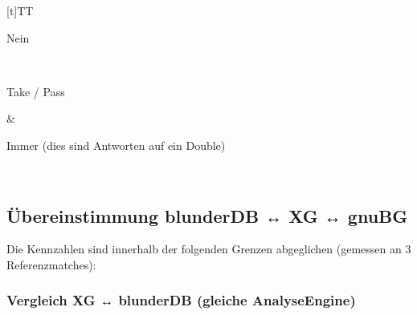 \documentclass[letterpaper,10pt,german]{sphinxmanual}
\begin{document}
\begin{savenotes}
\begin{tabulary}{\linewidth}[t]{TT}
\begin{varwidth}[t]{}
\sphinxAtStartPar
Nein
\sphinxbeforeendvarwidth
\end{varwidth}%
\\
\sphinxhline\begin{varwidth}[t]{}
\sphinxAtStartPar
Take / Pass
\sphinxbeforeendvarwidth
\end{varwidth}%
&\begin{varwidth}[t]{}
\sphinxAtStartPar
Immer (dies sind Antworten auf ein Double)
\sphinxbeforeendvarwidth
\end{varwidth}%
\\
\sphinxbottomrule
\end{tabulary}
\sphinxtableafterendhook\par
\sphinxattableend\end{savenotes}


\subsection{Übereinstimmung blunderDB ↔ XG ↔ gnuBG}
\label{\detokenize{stats_parity:correspondance-blunderdb-xg-gnubg}}
\sphinxAtStartPar
Die Kennzahlen sind innerhalb der folgenden Grenzen abgeglichen (gemessen an 3 Referenzmatches):


\subsubsection{Vergleich XG ↔ blunderDB (gleiche Analyse\sphinxhyphen{}Engine)}
\label{\detokenize{stats_parity:comparaison-xg-blunderdb-meme-moteur-d-analyse}}
\end{document}
